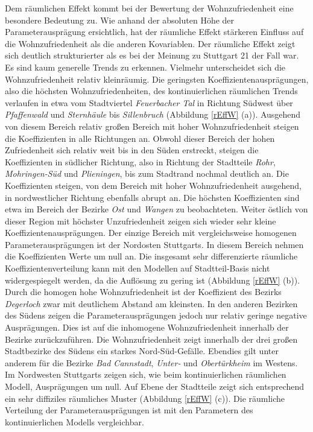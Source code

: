 \documentclass{Vorlage}
\begin{document}
Dem räumlichen Effekt kommt bei der Bewertung der Wohnzufriedenheit eine besondere Bedeutung zu. Wie anhand der absoluten Höhe der Parameterausprägung ersichtlich, hat der räumliche Effekt stärkeren Einfluss auf die Wohnzufriedenheit als die anderen Kovariablen. Der räumliche Effekt zeigt sich deutlich strukturierter als es bei der Meinung zu Stuttgart 21 der Fall war. Es sind kaum generelle Trends zu erkennen. Vielmehr unterscheidet sich die Wohnzufriedenheit relativ kleinräumig. Die geringsten Koeffizientenausprägungen, also die höchsten Wohnzufriedenheiten, des kontinuierlichen räumlichen Trends verlaufen in etwa vom Stadtviertel \textit{Feuerbacher Tal} in Richtung Südwest über \textit{Pfaffenwald} und \textit{Sternhäule} bis \textit{Sillenbruch} (Abbildung \ref{rEffW} (a)). Ausgehend von diesem Bereich relativ großen Bereich mit hoher Wohnzufriedenheit steigen die Koeffizienten in alle Richtungen an. Obwohl dieser Bereich der hohen Zufriedenheit sich relativ weit bis in den Süden erstreckt, steigen die Koeffizienten in südlicher Richtung, also in Richtung der Stadtteile \textit{Rohr}, \textit{Mohringen-Süd} und \textit{Plieningen}, bis zum Stadtrand nochmal deutlich an. Die Koeffizienten steigen, von dem Bereich mit hoher Wohnzufriedenheit ausgehend, in nordwestlicher Richtung ebenfalls abrupt an. Die höchsten  Koeffizienten sind etwa im Bereich der Bezirke \textit{Ost} und \textit{Wangen} zu beobachteten. Weiter östlich von dieser Region mit höchster Unzufriedenheit zeigen sich wieder sehr kleine Koeffizientenausprägungen. Der einzige Bereich mit vergleichsweise homogenen Parameterausprägungen ist der Nordosten Stuttgarts. In diesem Bereich nehmen die Koeffizienten Werte um null an. Die insgesamt sehr differenzierte räumliche Koeffizientenverteilung kann mit den Modellen auf Stadtteil-Basis nicht widergespiegelt werden, da die Auflösung zu gering ist (Abbildung \ref{rEffW} (b)). Durch die homogen hohe Wohnzufriedenheit ist der Koeffizient des Bezirks \textit{Degerloch} zwar mit deutlichem Abstand am kleinsten. In den anderen Bezirken des Südens zeigen die Parameterausprägungen jedoch nur relativ geringe negative Ausprägungen. Dies ist auf die inhomogene Wohnzufriedenheit innerhalb der Bezirke zurückzuführen. Die Wohnzufriedenheit zeigt innerhalb der drei großen Stadtbezirke des Südens ein starkes Nord-Süd-Gefälle. Ebendies gilt unter anderem für die Bezirke \textit{Bad Cannstadt}, \textit{Unter-} und \textit{Obertürkheim} im Westens. Im Nordwesten Stuttgarts zeigen sich, wie beim kontinuierlichen räumlichen Modell, Ausprägungen um null. Auf Ebene der Stadtteile zeigt sich entsprechend ein sehr diffiziles räumliches Muster (Abbildung \ref{rEffW} (c)). Die räumliche Verteilung der Parameterausprägungen ist mit den Parametern des kontinuierlichen Modells vergleichbar.
\end{document}
